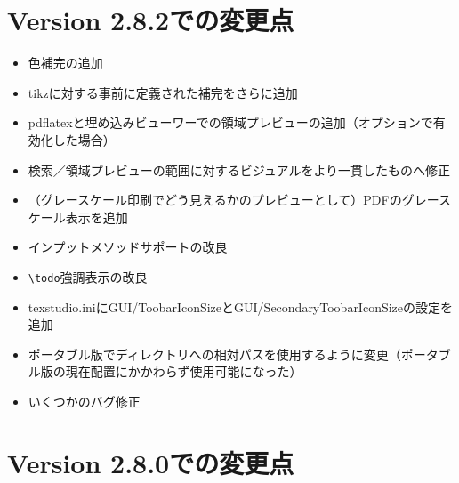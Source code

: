 \section{Version 2.8.2での変更点}

\begin{itemize}
\item
  色補完の追加
\item
  tikzに対する事前に定義された補完をさらに追加
\item
  pdflatexと埋め込みビューワーでの領域プレビューの追加（オプションで有効化した場合）
\item
  検索／領域プレビューの範囲に対するビジュアルをより一貫したものへ修正
\item
  （グレースケール印刷でどう見えるかのプレビューとして）PDFのグレースケール表示を追加
\item
  インプットメソッドサポートの改良
\item
  \verb+\todo+強調表示の改良
\item
  texstudio.iniにGUI/ToobarIconSizeとGUI/SecondaryToobarIconSizeの設定を追加
\item
  ポータブル版でディレクトリへの相対パスを使用するように変更（ポータブル版の現在配置にかかわらず使用可能になった）
\item
  いくつかのバグ修正
\end{itemize}

\section{Version 2.8.0での変更点}

